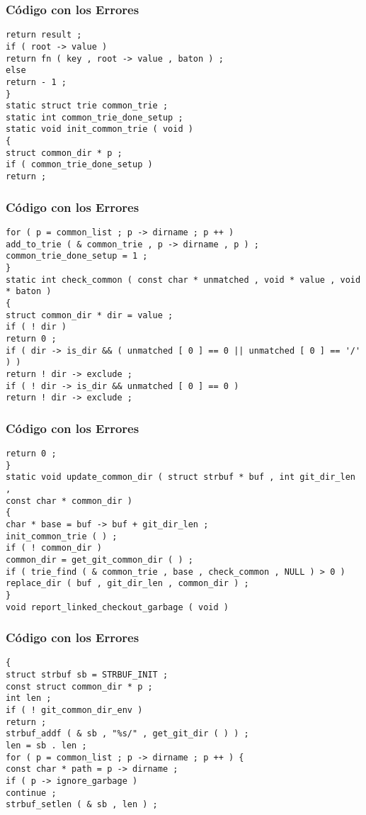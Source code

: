 \documentclass{beamer}
\begin{document}
\begin{frame}[fragile]
\frametitle{C\'odigo con los Errores}
\begin{verbatim}
return result ; 
if ( root -> value ) 
return fn ( key , root -> value , baton ) ; 
else 
return - 1 ; 
} 
static struct trie common_trie ; 
static int common_trie_done_setup ; 
static void init_common_trie ( void ) 
{ 
struct common_dir * p ; 
if ( common_trie_done_setup ) 
return ; 
\end{verbatim}
\end{frame}
\begin{frame}[fragile]
\frametitle{C\'odigo con los Errores}
\begin{verbatim}
for ( p = common_list ; p -> dirname ; p ++ ) 
add_to_trie ( & common_trie , p -> dirname , p ) ; 
common_trie_done_setup = 1 ; 
} 
static int check_common ( const char * unmatched , void * value , void * baton ) 
{ 
struct common_dir * dir = value ; 
if ( ! dir ) 
return 0 ; 
if ( dir -> is_dir && ( unmatched [ 0 ] == 0 || unmatched [ 0 ] == '/' ) ) 
return ! dir -> exclude ; 
if ( ! dir -> is_dir && unmatched [ 0 ] == 0 ) 
return ! dir -> exclude ; 
\end{verbatim}
\end{frame}
\begin{frame}[fragile]
\frametitle{C\'odigo con los Errores}
\begin{verbatim}
return 0 ; 
} 
static void update_common_dir ( struct strbuf * buf , int git_dir_len , 
const char * common_dir ) 
{ 
char * base = buf -> buf + git_dir_len ; 
init_common_trie ( ) ; 
if ( ! common_dir ) 
common_dir = get_git_common_dir ( ) ; 
if ( trie_find ( & common_trie , base , check_common , NULL ) > 0 ) 
replace_dir ( buf , git_dir_len , common_dir ) ; 
} 
void report_linked_checkout_garbage ( void ) 
\end{verbatim}
\end{frame}
\begin{frame}[fragile]
\frametitle{C\'odigo con los Errores}
\begin{verbatim}
{ 
struct strbuf sb = STRBUF_INIT ; 
const struct common_dir * p ; 
int len ; 
if ( ! git_common_dir_env ) 
return ; 
strbuf_addf ( & sb , "%s/" , get_git_dir ( ) ) ; 
len = sb . len ; 
for ( p = common_list ; p -> dirname ; p ++ ) { 
const char * path = p -> dirname ; 
if ( p -> ignore_garbage ) 
continue ; 
strbuf_setlen ( & sb , len ) ; 
\end{verbatim}
\end{frame}
\end{document}
